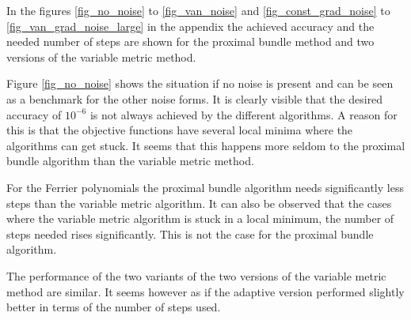 In the figures \ref{fig_no_noise} to \ref{fig_van_noise} and \ref{fig_const_grad_noise} to \ref{fig_van_grad_noise_large} in the appendix the achieved accuracy and the needed number of steps are shown for the proximal bundle method and two versions of the variable metric method.

Figure \ref{fig_no_noise} shows the situation if no noise is present and can be seen as a benchmark for the other noise forms.
It is clearly visible that the desired accuracy of \(10^{-6}\) is not always achieved by the different algorithms. A reason for this is that the objective functions have several local minima where the algorithms can get stuck. It seems that this happens more seldom to the proximal bundle algorithm than the variable metric method.

For the Ferrier polynomials the proximal bundle algorithm needs significantly less steps than the variable metric algorithm. It can also be observed that the cases where the variable metric algorithm is stuck in a local minimum, the number of steps needed rises significantly. This is not the case for the proximal bundle algorithm.

The performance of the two variants of the two versions of the variable metric method are similar. It seems however as if the adaptive version performed slightly better in terms of the number of steps used.


